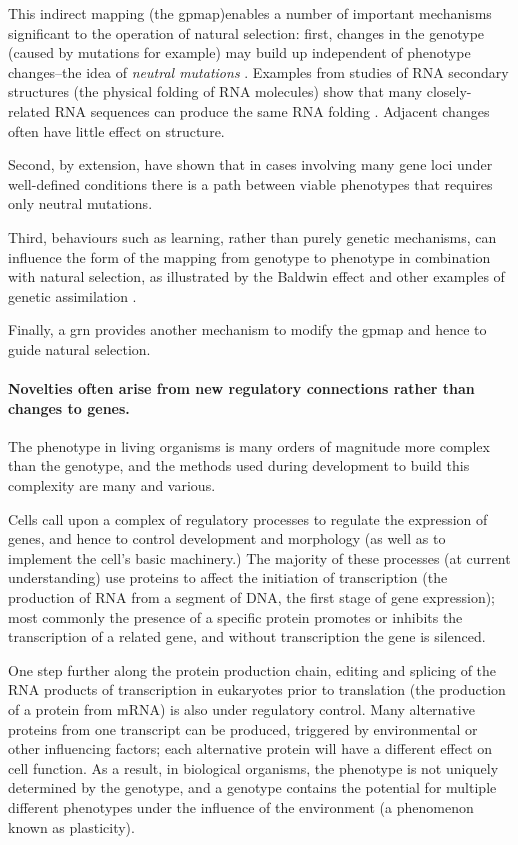 This indirect mapping (the \gls{gpmap})enables a number of important mechanisms significant to the operation of natural selection: first, changes in the genotype (caused by mutations for example) may build up independent of phenotype changes--the idea of \emph{neutral mutations} \parencite{Ohta:1996vn,Ohta:2002ys,Ohta:1973kx}. Examples from studies of RNA secondary structures (the physical folding of RNA molecules) show that many closely-related RNA sequences can produce the same RNA folding \parencite{Fontana:1993zn}. Adjacent changes often have little effect on structure.

Second, by extension, \textcite{Gavrilets:1997qt,Gravner:2007yd} have shown that in cases involving many gene loci under well-defined conditions there is a path between viable phenotypes that requires only neutral mutations.

Third, behaviours such as learning, rather than purely genetic mechanisms, can influence the form of the mapping from genotype to phenotype in combination with natural selection, as illustrated by the Baldwin effect \parencite{Baldwin:1896ly} and other examples of genetic assimilation \parencite{Hinton:1987vy,Siegal:2002qn,Waddington:1942jb}.

Finally, a \gls{grn} provides another mechanism to modify the \gls{gpmap} and hence to guide natural selection.

\paragraph{Novelties often arise from new regulatory connections rather than changes to genes.}

The phenotype in living organisms is many orders of magnitude more complex than the genotype, and the methods used during development to build this complexity are many and various.

Cells call upon a complex of regulatory processes to regulate the expression of genes, and hence to control development and morphology (as well as to implement the cell's basic machinery.) The majority of these processes (at current understanding) use proteins to affect the initiation of transcription (the production of RNA from a segment of DNA, the first stage of gene expression); most commonly the presence of a specific protein promotes or inhibits the transcription of a related gene, and without transcription the gene is silenced.

One step further along the protein production chain, editing and splicing of the RNA products of transcription in eukaryotes prior to translation (the production of a protein from mRNA) is also under regulatory control. Many alternative proteins from one transcript can be produced, triggered by environmental or other influencing factors; each alternative protein will have a different effect on cell function. As a result, in biological organisms, the phenotype is not uniquely determined by the genotype, and a genotype contains the potential for multiple different phenotypes under the influence of the environment (a phenomenon known as plasticity).

